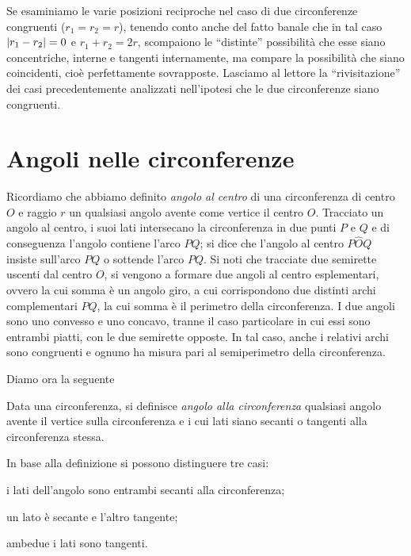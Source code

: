 \begin{figure}[htb]
	\centering
\end{figure}

Se esaminiamo le varie posizioni reciproche nel caso di due circonferenze congruenti ($r_1 = r_2 = r$), tenendo conto anche del fatto banale che in tal caso $\left|r_1 - r_2\right| = 0$ e $r_1 + r_2 = 2r$, scompaiono le ``distinte'' possibilità che esse siano concentriche, interne e tangenti internamente, ma compare la possibilità che siano coincidenti, cioè perfettamente sovrapposte.
Lasciamo al lettore la ``rivisitazione'' dei casi precedentemente analizzati nell'ipotesi che le due circonferenze siano congruenti.

\section{Angoli nelle circonferenze}

\noindent\begin{minipage}{0.6\textwidth}\parindent15pt
Ricordiamo che abbiamo definito \emph{angolo al centro} di una circonferenza di centro $O$ e raggio $r$ un qualsiasi angolo avente come vertice il centro $O$.
Tracciato un angolo al centro, i suoi lati intersecano la circonferenza in due punti $P$ e $Q$ e di conseguenza l'angolo contiene l'arco $PQ$; si dice che l'angolo al centro $P\widehat{O}Q$ insiste sull'arco $PQ$ o sottende l'arco $PQ$.
Si noti che tracciate due semirette uscenti dal centro $O$, si vengono a formare due angoli al centro esplementari, ovvero la cui somma è un angolo giro, a cui corrispondono due distinti archi complementari $PQ$, la cui somma è il perimetro della circonferenza. 
I due angoli sono uno convesso e uno concavo, tranne il caso particolare in cui essi sono entrambi piatti, con le due semirette opposte. In tal caso, anche i relativi archi sono congruenti e ognuno ha misura pari al semiperimetro della circonferenza.
\end{minipage}\hfil
\begin{minipage}{0.4\textwidth}
	\centering
\end{minipage}

Diamo ora la seguente
\begin{definizione}
Data una circonferenza, si definisce \emph{angolo alla circonferenza} qualsiasi angolo avente il vertice sulla circonferenza e i cui lati siano secanti o tangenti alla circonferenza stessa. 
\end{definizione}
In base alla definizione si possono distinguere tre casi:
\begin{itemize*}
\item i lati dell'angolo sono entrambi secanti alla circonferenza;
\item un lato è secante e l'altro tangente;
\item ambedue i lati sono tangenti.
\end{itemize*}

